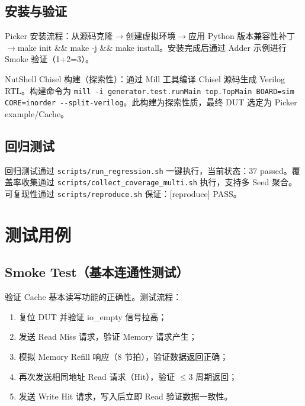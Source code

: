 \documentclass[12pt,a4paper]{ctexart}
\begin{document}
\subsection{安装与验证}

Picker 安装流程：从源码克隆$\rightarrow$创建虚拟环境$\rightarrow$应用 Python 版本兼容性补丁$\rightarrow$make init \&\& make -j \&\& make install。安装完成后通过 Adder 示例进行 Smoke 验证（1+2=3）。

NutShell Chisel 构建（探索性）：通过 Mill 工具编译 Chisel 源码生成 Verilog RTL。构建命令为 \lstinline{mill -i generator.test.runMain top.TopMain BOARD=sim CORE=inorder --split-verilog}。此构建为探索性质，最终 DUT 选定为 Picker example/Cache。

\subsection{回归测试}

回归测试通过 \lstinline{scripts/run_regression.sh} 一键执行，当前状态：37 passed。覆盖率收集通过 \lstinline{scripts/collect_coverage_multi.sh} 执行，支持多 Seed 聚合。可复现性通过 \lstinline{scripts/reproduce.sh} 保证：[reproduce] PASS。

\newpage

\section{测试用例}

\subsection{Smoke Test（基本连通性测试）}

验证 Cache 基本读写功能的正确性。测试流程：
\begin{enumerate}[leftmargin=*]
  \item 复位 DUT 并验证 io\_empty 信号拉高；
  \item 发送 Read Miss 请求，验证 Memory 请求产生；
  \item 模拟 Memory Refill 响应（8 节拍），验证数据返回正确；
  \item 再次发送相同地址 Read 请求（Hit），验证 $\le$3 周期返回；
  \item 发送 Write Hit 请求，写入后立即 Read 验证数据一致性。
\end{enumerate}
\end{document}
